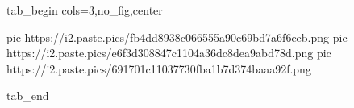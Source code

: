  
 
 
 
 


\ifcmt
  tab_begin cols=3,no_fig,center

     pic https://i2.paste.pics/fb4dd8938c066555a90c69bd7a6f6eeb.png
		 pic https://i2.paste.pics/e6f3d308847c1104a36dc8dea9abd78d.png
		 pic https://i2.paste.pics/691701c11037730fba1b7d374baaa92f.png

  tab_end
\fi
